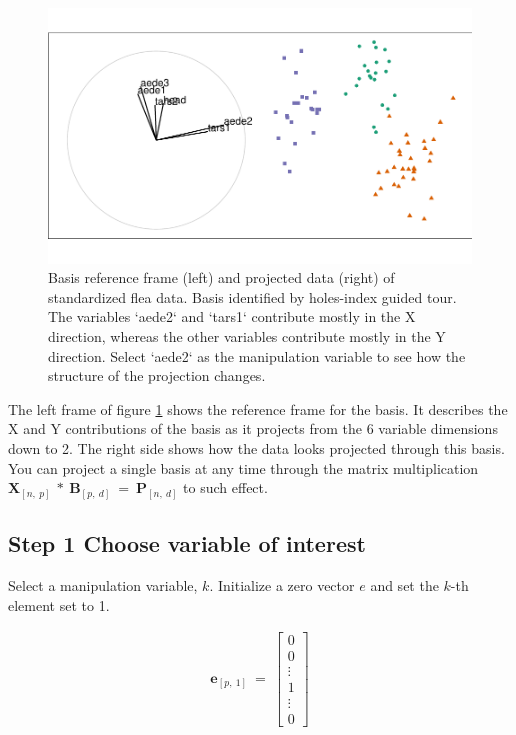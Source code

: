 \documentclass{monashthesis}
\begin{document}
\begin{figure}

{\centering \includegraphics[width=0.98\linewidth]{thesis_files/figure-latex/step0-1} 

}

\caption{Basis reference frame (left) and projected data (right) of standardized flea data. Basis identified by holes-index guided tour. The variables `aede2` and `tars1` contribute mostly in the X direction, whereas the other variables contribute mostly in the Y direction. Select `aede2` as the manipulation variable to see how the structure of the projection changes.}\label{fig:step0}
\end{figure}

The left frame of figure \ref{fig:step0} shows the reference frame for
the basis. It describes the X and Y contributions of the basis as it
projects from the 6 variable dimensions down to 2. The right side shows
how the data looks projected through this basis. You can project a
single basis at any time through the matrix multiplication
\(\textbf{X}_{[n,~p]} ~*~ \textbf{B}_{[p,~d]} ~=~ \textbf{P}_{[n,~d]}\)
to such effect.

\subsection{Step 1 Choose variable of
interest}\label{step-1-choose-variable-of-interest}

Select a manipulation variable, \(k\). Initialize a zero vector \(e\)
and set the \(k\)-th element set to 1.

\begin{align*}
\textbf{e}_{[p,~1]} ~=~
  \begin{bmatrix}
    0 \\
    0 \\
    \vdots \\
    1 \\
    \vdots \\
    0
  \end{bmatrix}
\end{align*}
\end{document}
